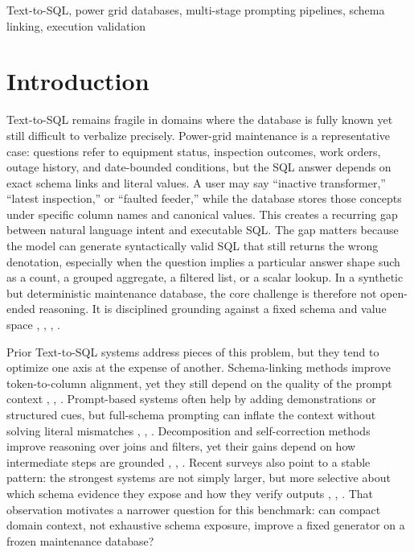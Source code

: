 \documentclass{ieeeaccess}
\begin{document}
\begin{keywords}
Text-to-SQL, power grid databases, multi-stage prompting pipelines, schema linking, execution validation
\end{keywords}
\titlepgskip=-21pt
\maketitle

\section{Introduction}\label{introduction}

Text-to-SQL remains fragile in domains where the database is fully known yet still difficult to verbalize precisely. Power-grid maintenance is a representative case: questions refer to equipment status, inspection outcomes, work orders, outage history, and date-bounded conditions, but the SQL answer depends on exact schema links and literal values. A user may say ``inactive transformer,'' ``latest inspection,'' or ``faulted feeder,'' while the database stores those concepts under specific column names and canonical values. This creates a recurring gap between natural language intent and executable SQL. The gap matters because the model can generate syntactically valid SQL that still returns the wrong denotation, especially when the question implies a particular answer shape such as a count, a grouped aggregate, a filtered list, or a scalar lookup. In a synthetic but deterministic maintenance database, the core challenge is therefore not open-ended reasoning. It is disciplined grounding against a fixed schema and value space \cite{zhong2020semantic}, \cite{lei2020reexamining}, \cite{liu2022semantic}, \cite{quamar2022natural}.

Prior Text-to-SQL systems address pieces of this problem, but they tend to optimize one axis at the expense of another. Schema-linking methods improve token-to-column alignment, yet they still depend on the quality of the prompt context \cite{lei2020reexamining}, \cite{gan2021robustness}, \cite{liu2021awakening}. Prompt-based systems often help by adding demonstrations or structured cues, but full-schema prompting can inflate the context without solving literal mismatches \cite{chang2023prompt}, \cite{nan2023enhancing}, \cite{sun2023sqlprompt}. Decomposition and self-correction methods improve reasoning over joins and filters, yet their gains depend on how intermediate steps are grounded \cite{pourreza2023dinsql}, \cite{wang2023macsql}, \cite{talaei2024chess}. Recent surveys also point to a stable pattern: the strongest systems are not simply larger, but more selective about which schema evidence they expose and how they verify outputs \cite{liu2024survey}, \cite{katsogiannismeimarakis2023survey}, \cite{huang2024survey}. That observation motivates a narrower question for this benchmark: can compact domain context, not exhaustive schema exposure, improve a fixed generator on a frozen maintenance database?
\end{document}
